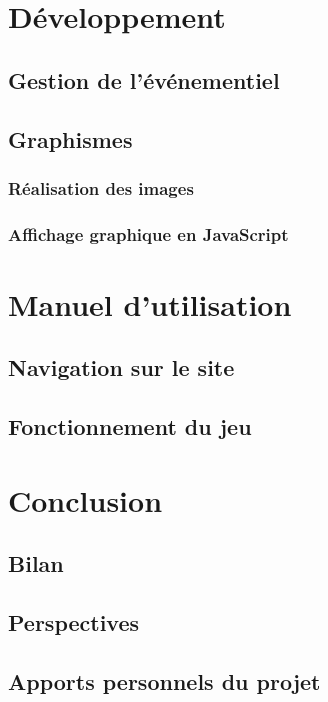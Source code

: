 \documentclass[12pt]{report}
\begin{document}
\chapter{Développement}
    
    \section{Gestion de l'événementiel}
    
    \section{Graphismes}
        
        \subsection{Réalisation des images}
        
        \subsection{Affichage graphique en JavaScript}
    
\chapter{Manuel d'utilisation}

    \section{Navigation sur le site}
    
    \section{Fonctionnement du jeu}
    
\chapter*{Conclusion}

    \section*{Bilan}
    
    \section*{Perspectives}

    \section*{Apports personnels du projet}
\end{document}
